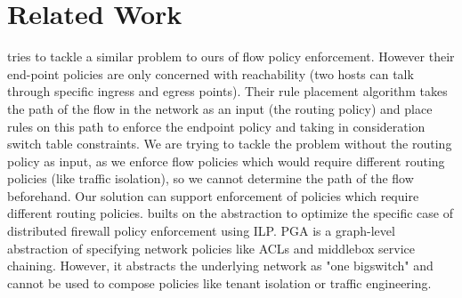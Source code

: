 \section{Related Work}

\cite{oneswitch} tries to tackle a similar problem to ours of flow policy enforcement. However their end-point policies are only concerned with reachability (two hosts can talk through specific ingress and egress points). Their rule placement algorithm takes the path of the flow in the network as an input (the routing policy) and place rules on this path to enforce the endpoint policy and taking in consideration switch table constraints. We are trying to tackle the problem without the routing policy as input, as we enforce flow policies which would require different routing policies (like traffic isolation), so we cannot determine the path of the flow beforehand. Our solution can support enforcement of policies which require different routing policies. \cite{distfirewall} builts on the \cite{oneswitch} abstraction to optimize the specific case of distributed firewall policy enforcement using ILP.  PGA  \cite{pga} is a graph-level abstraction of 
specifying network policies like ACLs and middlebox service chaining. However, it abstracts the underlying network as "one bigswitch" and 
cannot be used to compose policies like tenant isolation or traffic engineering.  

